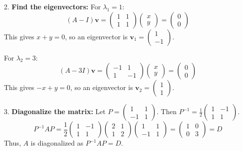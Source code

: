 2.  \textbf{Find the eigenvectors:}
    For \(\lambda_1 = 1\):
    \[
    (A - I)\mathbf{v} = \begin{pmatrix}
    1 & 1 \\
    1 & 1
    \end{pmatrix} \begin{pmatrix}
    x \\
    y
    \end{pmatrix} = \begin{pmatrix}
    0 \\
    0
    \end{pmatrix}
    \]
    This gives \(x + y = 0\), so an eigenvector is \(\mathbf{v}_1 = \begin{pmatrix} 1 \\ -1 \end{pmatrix}\).

    For \(\lambda_2 = 3\):
    \[
    (A - 3I)\mathbf{v} = \begin{pmatrix}
    -1 & 1 \\
    1 & -1
    \end{pmatrix} \begin{pmatrix}
    x \\
    y
    \end{pmatrix} = \begin{pmatrix}
    0 \\
    0
    \end{pmatrix}
    \]
    This gives \(-x + y = 0\), so an eigenvector is \(\mathbf{v}_2 = \begin{pmatrix} 1 \\ 1 \end{pmatrix}\).

3.  \textbf{Diagonalize the matrix:}
    Let \(P = \begin{pmatrix} 1 & 1 \\ -1 & 1 \end{pmatrix}\). Then \(P^{-1} = \frac{1}{2} \begin{pmatrix} 1 & -1 \\ 1 & 1 \end{pmatrix}\).
    \[
    P^{-1}AP = \frac{1}{2} \begin{pmatrix} 1 & -1 \\ 1 & 1 \end{pmatrix} \begin{pmatrix} 2 & 1 \\ 1 & 2 \end{pmatrix} \begin{pmatrix} 1 & 1 \\ -1 & 1 \end{pmatrix} = \begin{pmatrix} 1 & 0 \\ 0 & 3 \end{pmatrix} = D
    \]
    Thus, \(A\) is diagonalized as \(P^{-1}AP = D\).
